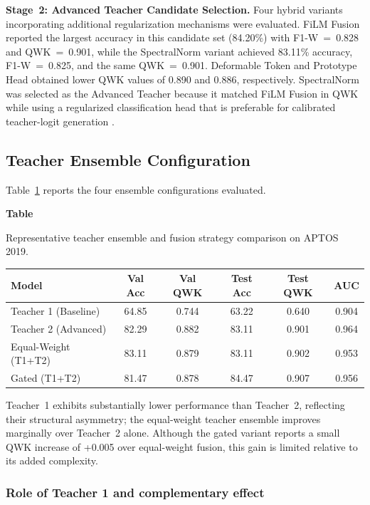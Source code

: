 \documentclass[a4paper,fleqn]{cas-dc}
\newcommand{\lefttablecaption}[2]{%
  \refstepcounter{table}\label{#1}%
  {\raggedright
  \textbf{Table~\thetable}\par\vspace{-2pt}
  #2\par}
}
\begin{document}
\textbf{Stage~2: Advanced Teacher Candidate Selection.} Four hybrid variants incorporating additional regularization mechanisms were evaluated. FiLM Fusion reported the largest accuracy in this candidate set (84.20\%) with F1-W~=~0.828 and QWK~=~0.901, while the SpectralNorm variant achieved 83.11\% accuracy, F1-W~=~0.825, and the same QWK~=~0.901. Deformable Token and Prototype Head obtained lower QWK values of 0.890 and 0.886, respectively. SpectralNorm was selected as the Advanced Teacher because it matched FiLM Fusion in QWK while using a regularized classification head that is preferable for calibrated teacher-logit generation \cite{miyato2018}.

\FloatBarrier

\subsection{Teacher Ensemble Configuration}
\label{sec:teacher_ensemble}

Table~\ref{tab:ensemble} reports the four ensemble configurations evaluated.

\begin{table}[width=\textwidth,pos=t]
\raggedright
\lefttablecaption{tab:ensemble}{Representative teacher ensemble and fusion strategy comparison on APTOS 2019.}
\begin{tabular*}{\textwidth}{@{\extracolsep{\fill}}lccccc@{}}
\toprule
Model & Val Acc & Val QWK & Test Acc & Test QWK & AUC \\
\midrule
Teacher 1 (Baseline) & 64.85 & 0.744 & 63.22 & 0.640 & 0.904 \\
Teacher 2 (Advanced) & 82.29 & 0.882 & 83.11 & 0.901 & 0.964 \\
Equal-Weight (T1+T2) & 83.11 & 0.879 & 83.11 & 0.902 & 0.953 \\
Gated (T1+T2) & 81.47 & 0.878 & 84.47 & 0.907 & 0.956 \\
\bottomrule
\end{tabular*}
\end{table}

Teacher~1 exhibits substantially lower performance than Teacher~2, reflecting their structural asymmetry; the equal-weight teacher ensemble improves marginally over Teacher~2 alone. Although the gated variant reports a small QWK increase of +0.005 over equal-weight fusion, this gain is limited relative to its added complexity.

\subsubsection{Role of Teacher 1 and complementary effect}
\end{document}
